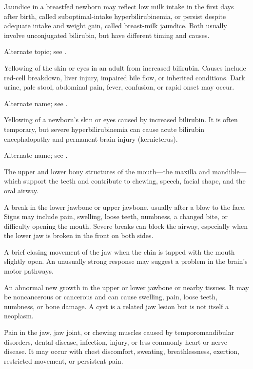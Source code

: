  Jaundice in a breastfed newborn may reflect low milk intake in the first days after birth, called suboptimal-intake hyperbilirubinemia, or persist despite adequate intake and weight gain, called breast-milk jaundice. Both usually involve unconjugated bilirubin, but have different timing and causes.

 Alternate topic; see .

 Yellowing of the skin or eyes in an adult from increased bilirubin. Causes include red-cell breakdown, liver injury, impaired bile flow, or inherited conditions. Dark urine, pale stool, abdominal pain, fever, confusion, or rapid onset may occur.

 Alternate name; see .

 Yellowing of a newborn’s skin or eyes caused by increased bilirubin. It is often temporary, but severe hyperbilirubinemia can cause acute bilirubin encephalopathy and permanent brain injury (kernicterus).

 Alternate name; see .

 The upper and lower bony structures of the mouth—the maxilla and mandible—which support the teeth and contribute to chewing, speech, facial shape, and the oral airway.

 A break in the lower jawbone or upper jawbone, usually after a blow to the face. Signs may include pain, swelling, loose teeth, numbness, a changed bite, or difficulty opening the mouth. Severe breaks can block the airway, especially when the lower jaw is broken in the front on both sides.

 A brief closing movement of the jaw when the chin is tapped with the mouth slightly open. An unusually strong response may suggest a problem in the brain's motor pathways.

 An abnormal new growth in the upper or lower jawbone or nearby tissues. It may be noncancerous or cancerous and can cause swelling, pain, loose teeth, numbness, or bone damage. A cyst is a related jaw lesion but is not itself a neoplasm.

 Pain in the jaw, jaw joint, or chewing muscles caused by temporomandibular disorders, dental disease, infection, injury, or less commonly heart or nerve disease. It may occur with chest discomfort, sweating, breathlessness, exertion, restricted movement, or persistent pain.

